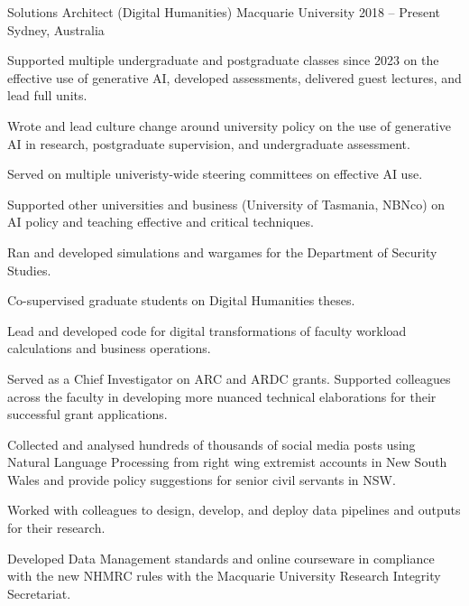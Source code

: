 

\begin{cventries}
\cventry
    {Solutions Architect (Digital Humanities)} %
    {Macquarie University} %
    {2018 -- Present} %
    {Sydney, Australia} %
    {\begin{cvitems}%
    \item Supported multiple undergraduate and postgraduate classes since 2023 on the effective use of generative AI, developed assessments, delivered guest lectures, and lead full units.
    \item Wrote and lead culture change around university policy on the use of generative AI in research, postgraduate supervision, and undergraduate assessment.
    \item Served on multiple univeristy-wide steering committees on effective AI use.
    \item Supported other universities and business (University of Tasmania, NBNco) on AI policy and teaching effective and critical techniques.
    \item Ran and developed simulations and wargames for the Department of Security Studies.
    \item Co-supervised graduate students on Digital Humanities theses.
    \item Lead and developed code for digital transformations of faculty workload calculations and business operations.
    \item Served as a Chief Investigator on ARC and ARDC grants. Supported colleagues across the faculty in developing more nuanced technical elaborations for their successful grant applications. 
    \item {Collected and analysed hundreds of thousands of social media posts using Natural Language Processing from right wing extremist accounts in New South Wales and provide policy suggestions for senior civil servants in NSW.}
    \item {Worked with colleagues to design, develop, and deploy data pipelines and outputs for their research.}
    \item {Developed Data Management standards and online courseware in compliance with the new NHMRC rules with the Macquarie University Research Integrity Secretariat.}

\end{cvitems}}
\end{cventries}
